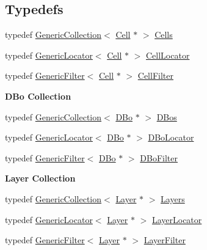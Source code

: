 \subsection*{Typedefs}
\begin{DoxyCompactItemize}
\item 
typedef \hyperlink{classHurricane_1_1GenericCollection}{Generic\+Collection}$<$ \hyperlink{classHurricane_1_1Cell}{Cell} $\ast$ $>$ \hyperlink{namespaceHurricane_a8b4ab14b26f36f43d83a50294410b44a}{Cells}
\item 
typedef \hyperlink{classHurricane_1_1GenericLocator}{Generic\+Locator}$<$ \hyperlink{classHurricane_1_1Cell}{Cell} $\ast$ $>$ \hyperlink{namespaceHurricane_abd99adab3b5944a4d1ace3d0b0b34f57}{Cell\+Locator}
\item 
typedef \hyperlink{classHurricane_1_1GenericFilter}{Generic\+Filter}$<$ \hyperlink{classHurricane_1_1Cell}{Cell} $\ast$ $>$ \hyperlink{namespaceHurricane_addb0e9cd376680ecea4966516694b799}{Cell\+Filter}
\end{DoxyCompactItemize}
\begin{Indent}\textbf{ D\+Bo Collection}\par
\begin{DoxyCompactItemize}
\item 
typedef \hyperlink{classHurricane_1_1GenericCollection}{Generic\+Collection}$<$ \hyperlink{classHurricane_1_1DBo}{D\+Bo} $\ast$ $>$ \hyperlink{namespaceHurricane_a0aa3882e095f9d425c253223d1c0793d}{D\+Bos}
\item 
typedef \hyperlink{classHurricane_1_1GenericLocator}{Generic\+Locator}$<$ \hyperlink{classHurricane_1_1DBo}{D\+Bo} $\ast$ $>$ \hyperlink{namespaceHurricane_a7d70ef7ad837859e453171feb692535c}{D\+Bo\+Locator}
\item 
typedef \hyperlink{classHurricane_1_1GenericFilter}{Generic\+Filter}$<$ \hyperlink{classHurricane_1_1DBo}{D\+Bo} $\ast$ $>$ \hyperlink{namespaceHurricane_a2af87173f0c45c5dc1f504d3ea2317d9}{D\+Bo\+Filter}
\end{DoxyCompactItemize}
\end{Indent}
\begin{Indent}\textbf{ Layer Collection}\par
\begin{DoxyCompactItemize}
\item 
typedef \hyperlink{classHurricane_1_1GenericCollection}{Generic\+Collection}$<$ \hyperlink{classHurricane_1_1Layer}{Layer} $\ast$ $>$ \hyperlink{namespaceHurricane_a7b7200a36ab7ce8a157ddbe78b625f38}{Layers}
\item 
typedef \hyperlink{classHurricane_1_1GenericLocator}{Generic\+Locator}$<$ \hyperlink{classHurricane_1_1Layer}{Layer} $\ast$ $>$ \hyperlink{namespaceHurricane_a91a93ea29be3e6658d72f9bee0da8c7b}{Layer\+Locator}
\item 
typedef \hyperlink{classHurricane_1_1GenericFilter}{Generic\+Filter}$<$ \hyperlink{classHurricane_1_1Layer}{Layer} $\ast$ $>$ \hyperlink{namespaceHurricane_a150e0e72c5c5609e0feb3311fa5bc127}{Layer\+Filter}
\end{DoxyCompactItemize}
\end{Indent}
